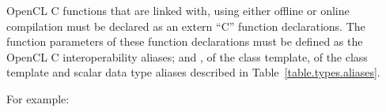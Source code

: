 OpenCL C functions that are linked with, using either offline or online
compilation must be declared as an extern ``C'' function declarations. The function
parameters of these function declarations must be defined as the OpenCL C
interoperability aliases;  and , of the  class template,  of the  class template and scalar data type aliases described in Table~\ref{table.types.aliases}.

For example:



